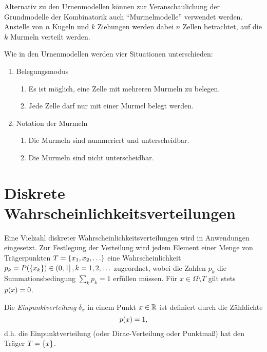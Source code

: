 \documentclass{lecture}
\begin{document}
    \begin{remark}
        Alternativ zu den Urnenmodellen können zur Veranschaulichung der Grundmodelle der Kombinatorik auch ``Murmelmodelle'' verwendet werden.
        Anstelle von \(n\) Kugeln und \(k\) Ziehungen werden dabei \(n\) Zellen betrachtet, auf die \(k\) Murmeln verteilt werden.

        Wie in den Urnenmodellen werden vier Situationen unterschieden:
        \begin{enumerate}[label=(\roman*)]
            \item Belegungsmodus
            \begin{enumerate}[label=\alph*)]
                \item Es ist möglich, eine Zelle mit mehreren Murmeln zu belegen.
                \item Jede Zelle darf nur mit einer Murmel belegt werden.
            \end{enumerate}
            \item Notation der Murmeln
            \begin{enumerate}[label=\alph*)]
                \item Die Murmeln sind nummeriert und unterscheidbar.
                \item Die Murmeln sind nicht unterscheidbar.
            \end{enumerate}
        \end{enumerate}
    \end{remark}


    \section*{Diskrete Wahrscheinlichkeitsverteilungen}

    Eine Vielzahl diskreter Wahrscheinlichkeitsverteilungen wird in Anwendungen eingesetzt.
    Zur Festlegung der Verteilung wird jedem Element einer Menge von Trägerpunkten \(T = \braces*{x_1, x_2, \ldots}\) eine Wahrscheinlichkeit \(p_k = P\parentheses*{\braces*{x_k}} \in \left(0, 1\right], k = 1, 2, \ldots\) zugeordnet, wobei die Zahlen \(p_k\) die Summationsbedingung \(\sum_k p_k = 1\) erfüllen müssen.
    Für \(x \in \Omega \setminus T\) gilt stets \(p\parentheses*{x} = 0\).

    \begin{definition}
        Die \emph{Einpunktverteilung} \(\delta_x\) in einem Punkt \(x \in \R\) ist definiert durch die Zähldichte
        \[
            p\parentheses*{x} = 1,
        \]
        d.h. die Einpunktverteilung (oder Dirac-Verteilung oder Punktmaß) hat den Träger \(T = \braces*{x}\).
    \end{definition}
\end{document}
